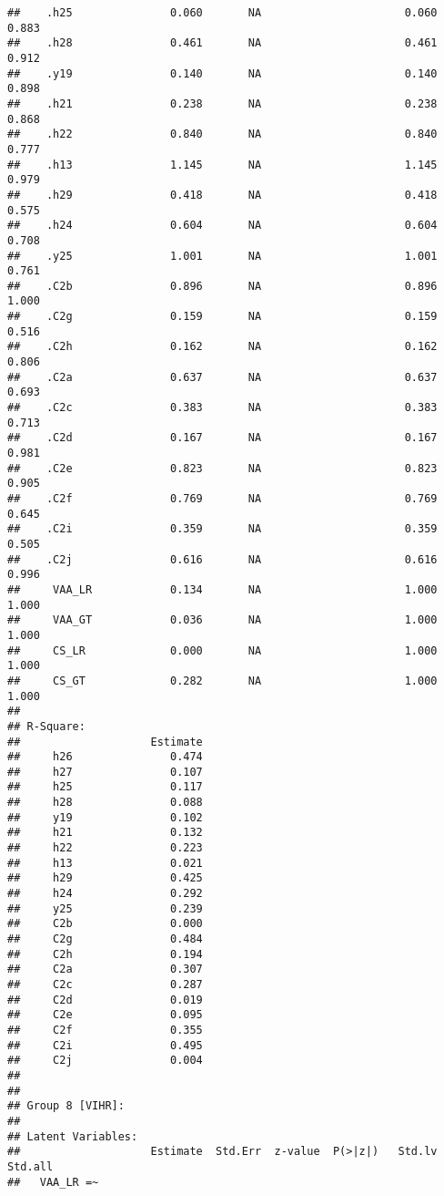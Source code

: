 \documentclass[
]{article}
\begin{document}
\begin{verbatim}
##    .h25               0.060       NA                      0.060    0.883
##    .h28               0.461       NA                      0.461    0.912
##    .y19               0.140       NA                      0.140    0.898
##    .h21               0.238       NA                      0.238    0.868
##    .h22               0.840       NA                      0.840    0.777
##    .h13               1.145       NA                      1.145    0.979
##    .h29               0.418       NA                      0.418    0.575
##    .h24               0.604       NA                      0.604    0.708
##    .y25               1.001       NA                      1.001    0.761
##    .C2b               0.896       NA                      0.896    1.000
##    .C2g               0.159       NA                      0.159    0.516
##    .C2h               0.162       NA                      0.162    0.806
##    .C2a               0.637       NA                      0.637    0.693
##    .C2c               0.383       NA                      0.383    0.713
##    .C2d               0.167       NA                      0.167    0.981
##    .C2e               0.823       NA                      0.823    0.905
##    .C2f               0.769       NA                      0.769    0.645
##    .C2i               0.359       NA                      0.359    0.505
##    .C2j               0.616       NA                      0.616    0.996
##     VAA_LR            0.134       NA                      1.000    1.000
##     VAA_GT            0.036       NA                      1.000    1.000
##     CS_LR             0.000       NA                      1.000    1.000
##     CS_GT             0.282       NA                      1.000    1.000
## 
## R-Square:
##                    Estimate
##     h26               0.474
##     h27               0.107
##     h25               0.117
##     h28               0.088
##     y19               0.102
##     h21               0.132
##     h22               0.223
##     h13               0.021
##     h29               0.425
##     h24               0.292
##     y25               0.239
##     C2b               0.000
##     C2g               0.484
##     C2h               0.194
##     C2a               0.307
##     C2c               0.287
##     C2d               0.019
##     C2e               0.095
##     C2f               0.355
##     C2i               0.495
##     C2j               0.004
## 
## 
## Group 8 [VIHR]:
## 
## Latent Variables:
##                    Estimate  Std.Err  z-value  P(>|z|)   Std.lv  Std.all
##   VAA_LR =~                                                             

\end{verbatim}
\end{document}
